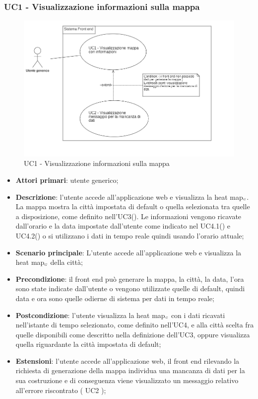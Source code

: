 \subsubsection{UC1 - Visualizzazione informazioni sulla mappa} %
\begin{center}
	\begin{figure}[H]
		\includegraphics[scale=0.8]{../immagini/attori_casi/uc1_uc2.png}
		\caption{UC1 - Visualizzazione informazioni sulla mappa}
	\end{figure}
\end{center}
\begin{itemize}
	\item \textbf{Attori primari}: utente generico;
	\item \textbf{Descrizione}: l’utente accede all’applicazione web e visualizza la heat map$_{\scaleto{G}{3pt}}$. La mappa mostra la città impostata di default o quella selezionata tra quelle a disposizione, come definito nell’UC3(). Le informazioni vengono ricavate dall’orario e la data impostate dall’utente come indicato nel UC4.1() e UC4.2() o si utilizzano i dati in tempo reale quindi usando l’orario attuale;
	\item \textbf{Scenario principale}: L’utente accede all’applicazione web e visualizza la heat map$_{\scaleto{G}{3pt}}$ della città;
	\item \textbf{Precondizione}: il front end può generare la mappa, la città, la data, l’ora sono state indicate dall’utente o vengono utilizzate quelle di default, quindi data e ora sono quelle odierne di sistema per dati in tempo reale;
	\item \textbf{Postcondizione}: l’utente visualizza la heat map$_{\scaleto{G}{3pt}}$ con i dati ricavati nell’istante di tempo selezionato, come definito nell’UC4, e alla città scelta fra quelle disponibili come descritto nella definizione dell’UC3, oppure visualizza quella riguardante la città impostata di default;
	\item \textbf{Estensioni}: l’utente accede all’applicazione web, il front end rilevando la richiesta di generazione della mappa individua una mancanza di dati per la sua costruzione e di conseguenza viene visualizzato un messaggio relativo all’errore riscontrato ( UC2 );
\end{itemize}

